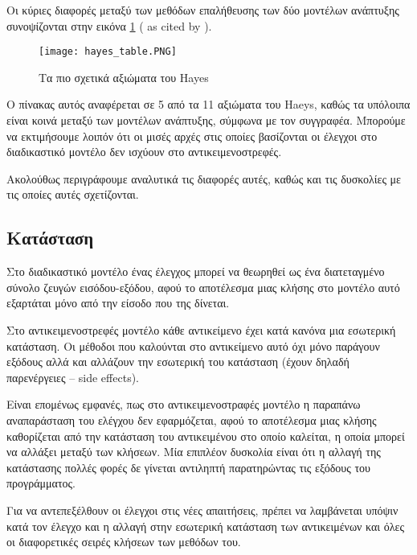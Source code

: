 \documentclass[12pt]{article}
\begin{document}
Οι κύριες διαφορές μεταξύ των μεθόδων επαλήθευσης των δύο μοντέλων ανάπτυξης συνοψίζονται στην εικόνα \ref{fig:hayes_table} (\textcite{hayes} as cited by \textcite{gordon}).

\begin{figure}
\label{fig:hayes_table}
\caption{Τα πιο σχετικά αξιώματα του Hayes}
\texttt{[image: hayes\_table.PNG]}
\end{figure}

\par Ο πίνακας αυτός αναφέρεται σε 5 από τα 11 αξιώματα του Haeys, καθώς τα υπόλοιπα είναι κοινά μεταξύ των μοντέλων ανάπτυξης, σύμφωνα με τον συγγραφέα. Μπορούμε να εκτιμήσουμε λοιπόν ότι οι μισές αρχές στις οποίες βασίζονται οι έλεγχοι στο διαδικαστικό μοντέλο δεν ισχύουν στο αντικειμενοστρεφές.

\par Ακολούθως περιγράφουμε αναλυτικά τις διαφορές αυτές, καθώς και τις δυσκολίες με τις οποίες αυτές σχετίζονται.

\subsection{Κατάσταση}

Στο διαδικαστικό μοντέλο ένας έλεγχος μπορεί να θεωρηθεί ως ένα διατεταγμένο σύνολο ζευγών εισόδου-εξόδου, αφού το αποτέλεσμα μιας κλήσης στο μοντέλο αυτό εξαρτάται μόνο από την είσοδο που της δίνεται.

\par Στο αντικειμενοστρεφές μοντέλο κάθε αντικείμενο έχει κατά κανόνα μια εσωτερική κατάσταση. Οι μέθοδοι που καλούνται στο αντικείμενο αυτό όχι μόνο παράγουν εξόδους αλλά και αλλάζουν την εσωτερική του κατάσταση (έχουν δηλαδή παρενέργειες – side effects).

\par Είναι επομένως εμφανές, πως στο αντικειμενοστραφές μοντέλο η παραπάνω αναπαράσταση του ελέγχου δεν εφαρμόζεται, αφού το αποτέλεσμα μιας κλήσης καθορίζεται από την κατάσταση του αντικειμένου στο οποίο καλείται, η οποία μπορεί να αλλάξει μεταξύ των κλήσεων. Μία επιπλέον δυσκολία είναι ότι η αλλαγή της κατάστασης πολλές φορές δε γίνεται αντιληπτή παρατηρώντας τις εξόδους του προγράμματος.

\par Για να αντεπεξέλθουν οι έλεγχοι στις νέες απαιτήσεις, πρέπει να λαμβάνεται υπόψιν κατά τον έλεγχο και η αλλαγή στην εσωτερική κατάσταση των αντικειμένων και όλες οι διαφορετικές σειρές κλήσεων των μεθόδων του.
\end{document}
